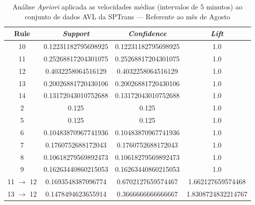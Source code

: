 \documentclass[
	12pt,				%
	oneside,			%
	a4paper,			%
	english,			%
	brazil				%
	]{abntex2ppgsi}
\begin{document}
\begin{apendicesenv}
\begin{table}[!htb]
\centering
\caption {Análise \textit{Apriori} aplicada as velocidades médias (intervalos de 5 minutos) ao conjunto de dados AVL da SPTrans --- Referente ao mês de Agosto}
\label {tab:aprioriAugust}
\begin{tabular}{c|c|c|c}
\hline
\textbf{Rule} & \textit{\textbf{Support}} & \textit{\textbf{Confidence}} & \textit{\textbf{Lift}} \\
\hline
10 &  0.12231182795698925 &  0.12231182795698925 &  1.0\\
\hline
11 &  0.25268817204301075 &  0.25268817204301075 &  1.0\\
\hline
12 &  0.4032258064516129 &  0.4032258064516129 &  1.0\\
\hline
13 &  0.20026881720430106 &  0.20026881720430106 &  1.0\\
\hline
14 &  0.13172043010752688 &  0.13172043010752688 &  1.0\\
\hline
2 &  0.125 &  0.125 &  1.0\\
\hline
5 &  0.125 &  0.125 &  1.0\\
\hline
6 &  0.10483870967741936 &  0.10483870967741936 &  1.0\\
\hline
7 &  0.1760752688172043 &  0.1760752688172043 &  1.0\\
\hline
8 &  0.10618279569892473 &  0.10618279569892473 &  1.0\\
\hline
9 &  0.16263440860215053 &  0.16263440860215053 &  1.0\\
\hline
11 $\rightarrow$ 12 &  0.1693548387096774 &  0.6702127659574467 &  1.662127659574468\\
\hline
13 $\rightarrow$ 12 &  0.1478494623655914 &  0.3666666666666667 &  1.8308724832214767\\
\hline
\end{tabular}
\end{table}


\end{apendicesenv}
\end{document}
